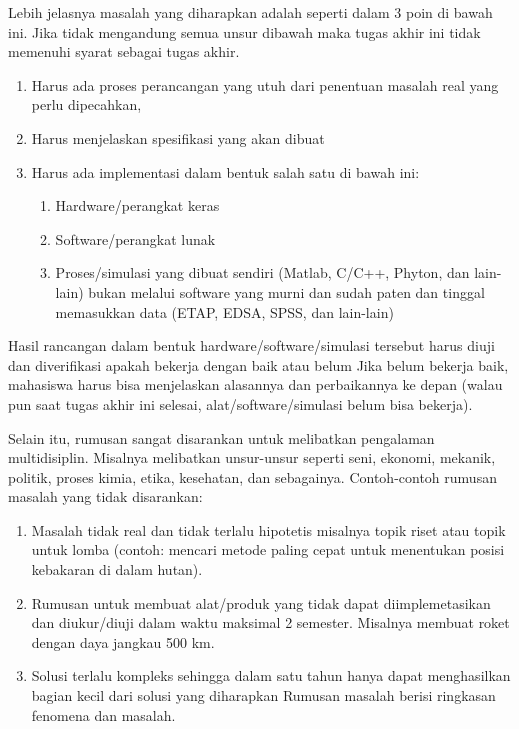 Lebih jelasnya masalah yang diharapkan adalah seperti dalam 3 poin di bawah ini. Jika tidak mengandung semua unsur dibawah maka tugas akhir ini tidak memenuhi syarat sebagai tugas akhir. \par
\begin{enumerate}
	\item Harus ada proses perancangan yang utuh dari penentuan masalah real yang perlu dipecahkan, 
	\item Harus menjelaskan spesifikasi yang akan dibuat
	\item Harus ada implementasi dalam bentuk salah satu di bawah ini:
	\begin{enumerate}
		\item Hardware/perangkat keras
		\item Software/perangkat lunak
		\item Proses/simulasi yang dibuat sendiri (Matlab, C/C++, Phyton, dan lain-lain) bukan melalui software yang murni dan sudah paten dan tinggal memasukkan data (ETAP, EDSA, SPSS, dan lain-lain)
	\end{enumerate}
\end{enumerate}

Hasil rancangan dalam bentuk hardware/software/simulasi tersebut harus diuji dan diverifikasi apakah bekerja dengan baik atau belum Jika belum bekerja baik, mahasiswa harus bisa menjelaskan alasannya dan perbaikannya ke depan (walau pun saat tugas akhir ini selesai, alat/software/simulasi belum bisa bekerja).\par

Selain itu, rumusan sangat disarankan untuk melibatkan pengalaman multidisiplin. Misalnya melibatkan unsur-unsur seperti seni, ekonomi, mekanik, politik, proses kimia, etika, kesehatan, dan sebagainya. Contoh-contoh rumusan masalah yang tidak disarankan: \par
\begin{enumerate}
	\item Masalah tidak real dan tidak terlalu hipotetis misalnya topik riset atau topik untuk lomba (contoh: mencari metode paling cepat untuk menentukan posisi kebakaran di dalam hutan).
	\item Rumusan untuk membuat alat/produk yang tidak dapat diimplemetasikan dan diukur/diuji dalam waktu maksimal 2 semester. Misalnya membuat roket dengan daya jangkau 500 km.
	\item Solusi terlalu kompleks sehingga dalam satu tahun hanya dapat menghasilkan bagian kecil dari solusi yang diharapkan Rumusan masalah berisi ringkasan fenomena dan masalah.
\end{enumerate}


